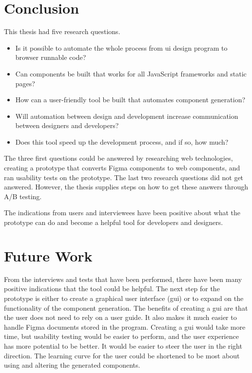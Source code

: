 \section{Conclusion}
\label{sub:conclusion}
This thesis had five research questions.  
\begin{itemize}
  \item Is it possible to automate the whole process from \acrshort{ui} design program to browser runnable code? 
 \item Can components be built that works for all JavaScript frameworks and static pages?
  \item How can a user-friendly tool be built that automates component generation?  
  \item Will automation between design and development increase communication between designers and developers?
  \item Does this tool speed up the development process, and if so, how much? 
\end{itemize}

The three first questions could be answered by researching web technologies, creating a prototype that converts Figma components to web components, and ran usability tests on the prototype. The last two research questions did not get answered. However, the thesis supplies steps on how to get these answers through A/B testing. 

The indications from users and interviewees have been positive about what the prototype can do and become a helpful tool for developers and designers. 

\section{Future Work}%
\label{sub:Future Work}

From the interviews and tests that have been performed, there have been many positive indications that the tool could be helpful. The next step for the prototype is either to create a graphical user interface (\acrshort{gui}) or to expand on the functionality of the component generation. The benefits of creating a \acrshort{gui} are that the user does not need to rely on a user guide. It also makes it much easier to handle Figma documents stored in the program. Creating a \acrshort{gui} would take more time, but usability testing would be easier to perform, and the user experience has more potential to be better. It would be easier to steer the user in the right direction. The learning curve for the user could be shortened to be most about using and altering the generated components. 

